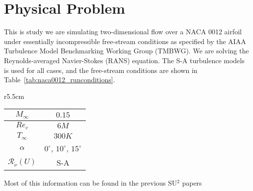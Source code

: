 
\section{Physical Problem}

This is study we are simulating two-dimensional flow over a NACA 0012 airfoil under essentially incompressible free-stream conditions as specified by the AIAA Turbulence Model Benchmarking Working Group (TMBWG).  We are solving the Reynolds-averaged Navier-Stokes (RANS) equation. The S-A  turbulence models is used for all cases, and the free-stream conditions are shown in Table~\ref{tab:naca0012_runconditions}. 

\begin{wraptable}{r}{5.5cm}
  \begin{center}
  \begin{tabular}{||c|c||} \hline
    $M_\infty$ & $0.15$ \\ \hline 
    $Re_c$     & $6M$ \\ \hline
    $T_\infty$ & $300K$ \\ \hline
    $\alpha$ & $0^{\circ}$, $10^{\circ}$, $15^{\circ}$ \\ \hline
    $\mathcal{R}_{\tilde\nu}(U)$ & S-A \\ \hline
  \end{tabular}
  \caption{NACA 0012 free-stream conditions.} \label{tab:naca0012_runconditions}
  \end{center}
\end{wraptable} 






Most of this information can be found in the previous SU$^2$ papers \cite{Palacios:2014,PalaciosEconomon:2014}